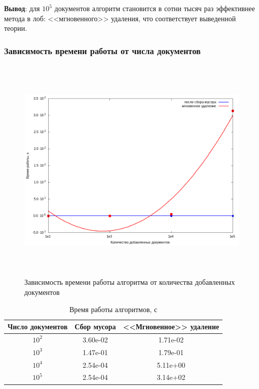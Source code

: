 \textbf{Вывод}: для $10^5$ документов алгоритм становится в сотни тысяч раз
эффективнее метода в лоб: <<мгновенного>> удаления, что соответствует выведенной теории.

\subsubsection{Зависимость времени работы от числа документов}

\begin{figure}[H]
\includegraphics[width=\linewidth, height=11cm]{fig/time.png}
\caption{Зависимость времени работы алгоритма от количества добавленных документов}
\end{figure}

\begin{table}[H]
      \caption{Время работы алгоритмов, с}
      \centering
      \small
      \singlespacing
      \begin{tabular}{|c|c|c|}
            \hline
            Число документов & Сбор мусора                & <<Мгновенное>> удаление \\ \hline \hline
            $10^2$           & 3.60e-02                   & 1.71e-02              \\ \hline
            $10^3$           & 1.47e-01                   & 1.79e-01              \\ \hline
            $10^4$           & 2.54e-04                   & 5.11e+00              \\ \hline
            $10^5$           & 2.54e-04                   & 3.14e+02              \\ \hline
\end{tabular}
\end{table}

